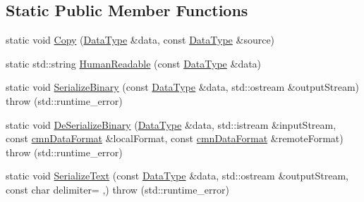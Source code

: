 \subsection*{Static Public Member Functions}
\begin{DoxyCompactItemize}
\item 
static void \hyperlink{classcmn_data_3_01vct_fixed_size_vector_3_01__element_type_00_01__size_01_4_01_4_a6d60327eefc877cc557498fcb94bf9b2}{Copy} (\hyperlink{classcmn_data_3_01vct_fixed_size_vector_3_01__element_type_00_01__size_01_4_01_4_ac8ff1c45828cc2add8111e02980f183a}{Data\+Type} \&data, const \hyperlink{classcmn_data_3_01vct_fixed_size_vector_3_01__element_type_00_01__size_01_4_01_4_ac8ff1c45828cc2add8111e02980f183a}{Data\+Type} \&source)
\item 
static std\+::string \hyperlink{classcmn_data_3_01vct_fixed_size_vector_3_01__element_type_00_01__size_01_4_01_4_a3effe8f00f315215c6e1b05544f0f9a2}{Human\+Readable} (const \hyperlink{classcmn_data_3_01vct_fixed_size_vector_3_01__element_type_00_01__size_01_4_01_4_ac8ff1c45828cc2add8111e02980f183a}{Data\+Type} \&data)
\item 
static void \hyperlink{classcmn_data_3_01vct_fixed_size_vector_3_01__element_type_00_01__size_01_4_01_4_a3f99570554b28da956a0e3fb5834609a}{Serialize\+Binary} (const \hyperlink{classcmn_data_3_01vct_fixed_size_vector_3_01__element_type_00_01__size_01_4_01_4_ac8ff1c45828cc2add8111e02980f183a}{Data\+Type} \&data, std\+::ostream \&output\+Stream)  throw (std\+::runtime\+\_\+error)
\item 
static void \hyperlink{classcmn_data_3_01vct_fixed_size_vector_3_01__element_type_00_01__size_01_4_01_4_a0de71af3cc573c2052e6cfbbc2a446bd}{De\+Serialize\+Binary} (\hyperlink{classcmn_data_3_01vct_fixed_size_vector_3_01__element_type_00_01__size_01_4_01_4_ac8ff1c45828cc2add8111e02980f183a}{Data\+Type} \&data, std\+::istream \&input\+Stream, const \hyperlink{classcmn_data_format}{cmn\+Data\+Format} \&local\+Format, const \hyperlink{classcmn_data_format}{cmn\+Data\+Format} \&remote\+Format)  throw (std\+::runtime\+\_\+error)
\item 
static void \hyperlink{classcmn_data_3_01vct_fixed_size_vector_3_01__element_type_00_01__size_01_4_01_4_af1bc79748f67c39e6c812562a965db56}{Serialize\+Text} (const \hyperlink{classcmn_data_3_01vct_fixed_size_vector_3_01__element_type_00_01__size_01_4_01_4_ac8ff1c45828cc2add8111e02980f183a}{Data\+Type} \&data, std\+::ostream \&output\+Stream, const char delimiter= \textquotesingle{},\textquotesingle{})  throw (std\+::runtime\+\_\+error)

\end{DoxyCompactItemize}
